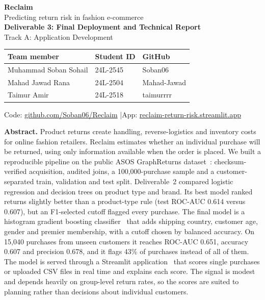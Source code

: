 \documentclass[11pt,a4paper]{article}
\begin{document}
{\LARGE\bfseries\color{reclaim} Reclaim}\\[3pt]
{\large Predicting return risk in fashion e-commerce}\\[4pt]
\textbf{Deliverable 3: Final Deployment and Technical Report}\\
Track A: Application Development

\begin{center}
\begin{tabularx}{\linewidth}{Xll}
\toprule Team member & Student ID & GitHub\\ \midrule
Muhammad Soban Sohail & 24L-2545 & Soban06\\
Mahad Jawad Rana & 24L-2504 & Mahad-Jawad\\
Taimur Amir & 24L-2518 & taimurrrr\\ \bottomrule
\end{tabularx}
\end{center}
Code: \href{https://github.com/Soban06/Reclaim}{github.com/Soban06/Reclaim} \enspace|\enspace App: \href{https://reclaim-return-risk.streamlit.app}{reclaim-return-risk.streamlit.app}

\begin{center}
\colorbox{wash}{\parbox{.94\linewidth}{\vspace{4pt}
\textbf{Abstract.} Product returns create handling, reverse-logistics and inventory costs for online fashion retailers. Reclaim estimates whether an individual purchase will be returned, using only information available when the order is placed. We built a reproducible pipeline on the public ASOS GraphReturns dataset~\cite{data,paper}: checksum-verified acquisition, audited joins, a 100,000-purchase sample and a customer-separated train, validation and test split. Deliverable~2 compared logistic regression and decision trees on product type and brand. Its best model ranked returns slightly better than a product-type rule (test ROC-AUC 0.614 versus 0.607), but an F1-selected cutoff flagged every purchase. The final model is a histogram gradient boosting classifier~\cite{friedman,lightgbm} that adds shipping country, customer age, gender and premier membership, with a cutoff chosen by balanced accuracy. On 15,040 purchases from unseen customers it reaches ROC-AUC 0.651, accuracy 0.607 and precision 0.678, and it flags 43\% of purchases instead of all of them. The model is served through a Streamlit application~\cite{streamlit} that scores single purchases or uploaded CSV files in real time and explains each score. The signal is modest and depends heavily on group-level return rates, so the scores are suited to planning rather than decisions about individual customers.
\vspace{4pt}}}
\end{center}
\end{document}
